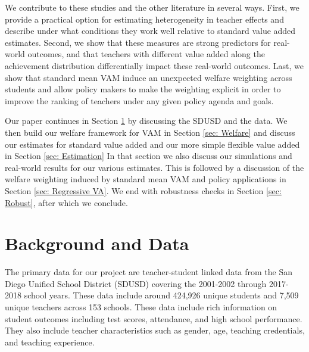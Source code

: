 \documentclass[letterpaper,12pt]{article}
\begin{document}
We contribute to these studies and the other literature in several ways. First, we provide a practical option for estimating heterogeneity in teacher effects and describe under what conditions they work well relative to standard value added estimates. Second, we show that these measures are strong predictors for real-world outcomes, and that teachers with different value added along the achievement distribution differentially impact these real-world outcomes. Last, we show that standard mean VAM induce an unexpected welfare weighting across students and allow policy makers to make the weighting explicit in order to improve the ranking of teachers under any given policy agenda and goals.

Our paper continues in Section \ref{sec: Data} by discussing the SDUSD and the data. We then build our welfare framework for VAM in Section \ref{sec: Welfare} and discuss our estimates for standard value added and our more simple flexible value added in Section \ref{sec: Estimation} In that section we also discuss our simulations and real-world results for our various estimates. This is followed by a discussion of the welfare weighting induced by standard mean VAM and policy applications in Section \ref{sec: Regressive VA}. We end with robustness checks in Section \ref{sec: Robust}, after which we conclude.




\section{Background and Data}\label{sec: Data}

The primary data for our project are teacher-student linked data from the San Diego Unified School District (SDUSD) covering the 2001-2002 through 2017-2018 school years. These data include around 424,926 unique students and 7,509 unique teachers across 153 schools. These data include rich information on student outcomes including test scores, attendance, and high school performance. They also include teacher characteristics such as gender, age, teaching credentials, and teaching experience.
\end{document}
